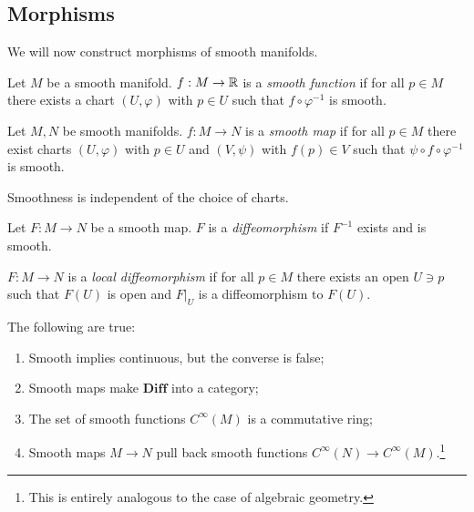 \documentclass[twoside, 10pt]{article}
\begin{document}
    \subsection{Morphisms}%
    \label{sub:morphisms}
    
    

    We will now construct morphisms of smooth manifolds.

    \begin{defn}
        Let $M$ be a smooth manifold. $f: M \to \mathbb{R}$ is a \textit{smooth function} if for all $p \in M$ there exists a chart $(U, \varphi)$ with $p \in U$ such that $f \circ \varphi^{-1}$ is smooth.
    \end{defn}

    \begin{defn}
        Let $M,N$ be smooth manifolds. $f:M \to N$ is a \textit{smooth map} if for all $p \in M$ there exist charts $(U, \varphi)$ with $p \in U$ and $(V, \psi)$ with $f(p) \in V$ such that $\psi \circ f \circ \varphi^{-1}$ is smooth.
    \end{defn}

    \begin{rmk}
        Smoothness is independent of the choice of charts.
    \end{rmk}

    \begin{defn}
        Let $F: M \to N$ be a smooth map. $F$ is a \textit{ diffeomorphism  }if $F^{-1}$ exists and is smooth.
    \end{defn}

    \begin{defn}
        $F: M \to N$ is a \textit{local diffeomorphism} if for all $p \in M$ there exists an open $U \ni p$ such that $F(U)$ is open and $F|_U$ is a diffeomorphism to $F(U)$.
    \end{defn}
    
    \begin{prop}
        The following are true:
        \begin{enumerate}
            \item Smooth implies continuous, but the converse is false;
            \item Smooth maps make $\mathbf{Diff}$ into a category;
            \item The set of smooth functions $C^{\infty}(M)$ is a commutative ring;
            \item Smooth maps $M \to N$ pull back smooth functions $C^{\infty}(N) \to C^{\infty}(M)$.\footnote{This is entirely analogous to the case of algebraic geometry.}
        \end{enumerate}
    \end{prop}
\end{document}
